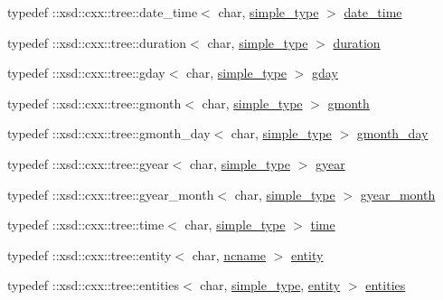 \begin{DoxyCompactItemize}
\item 
typedef \+::xsd\+::cxx\+::tree\+::date\+\_\+time$<$ char, \hyperlink{namespacexml__schema_a2ee8a034145ffa154d46910b41892495}{simple\+\_\+type} $>$ \hyperlink{namespacexml__schema_a94af98c4870fb2715706678639c97224}{date\+\_\+time}
\item 
typedef \+::xsd\+::cxx\+::tree\+::duration$<$ char, \hyperlink{namespacexml__schema_a2ee8a034145ffa154d46910b41892495}{simple\+\_\+type} $>$ \hyperlink{namespacexml__schema_a1acfdda85b50d50b1718ab6917a8f993}{duration}
\item 
typedef \+::xsd\+::cxx\+::tree\+::gday$<$ char, \hyperlink{namespacexml__schema_a2ee8a034145ffa154d46910b41892495}{simple\+\_\+type} $>$ \hyperlink{namespacexml__schema_a80cbdd05209953df8c443ba8d81d4c25}{gday}
\item 
typedef \+::xsd\+::cxx\+::tree\+::gmonth$<$ char, \hyperlink{namespacexml__schema_a2ee8a034145ffa154d46910b41892495}{simple\+\_\+type} $>$ \hyperlink{namespacexml__schema_afe97b9ae1d131c601ce16f8bb4cdc022}{gmonth}
\item 
typedef \+::xsd\+::cxx\+::tree\+::gmonth\+\_\+day$<$ char, \hyperlink{namespacexml__schema_a2ee8a034145ffa154d46910b41892495}{simple\+\_\+type} $>$ \hyperlink{namespacexml__schema_a61e87eff200c80a4fce76244d6d01296}{gmonth\+\_\+day}
\item 
typedef \+::xsd\+::cxx\+::tree\+::gyear$<$ char, \hyperlink{namespacexml__schema_a2ee8a034145ffa154d46910b41892495}{simple\+\_\+type} $>$ \hyperlink{namespacexml__schema_a180526e3ae3592e56a0037c1f2ec8e5b}{gyear}
\item 
typedef \+::xsd\+::cxx\+::tree\+::gyear\+\_\+month$<$ char, \hyperlink{namespacexml__schema_a2ee8a034145ffa154d46910b41892495}{simple\+\_\+type} $>$ \hyperlink{namespacexml__schema_a8da9330a638589b1ef456991753a2804}{gyear\+\_\+month}
\item 
typedef \+::xsd\+::cxx\+::tree\+::time$<$ char, \hyperlink{namespacexml__schema_a2ee8a034145ffa154d46910b41892495}{simple\+\_\+type} $>$ \hyperlink{namespacexml__schema_a59aaa57bb5452c1f6c6111f1501277d4}{time}
\item 
typedef \+::xsd\+::cxx\+::tree\+::entity$<$ char, \hyperlink{namespacexml__schema_adb64d7469eb27804ae649fbaccba54d6}{ncname} $>$ \hyperlink{namespacexml__schema_acbf59a94b42e0d01cdfc56b93465912a}{entity}
\item 
typedef \+::xsd\+::cxx\+::tree\+::entities$<$ char, \hyperlink{namespacexml__schema_a2ee8a034145ffa154d46910b41892495}{simple\+\_\+type}, \hyperlink{namespacexml__schema_acbf59a94b42e0d01cdfc56b93465912a}{entity} $>$ \hyperlink{namespacexml__schema_a27645dad916b7c154cfa441c84cfb8f8}{entities}

\end{DoxyCompactItemize}
